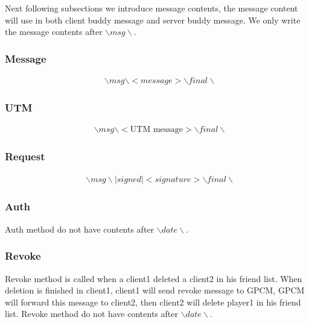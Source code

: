 \documentclass[oneside,titlepage,a4paper]{Definition/retrospy} %
\begin{document}
Next following subsections we introduce message contents,  the message content will use in both client buddy message and server buddy message. We only write the message contents after $ \backslash msg \backslash $.
\subsubsection{Message}
\begin{tcolorbox}
	\begin{equation}
	\begin{split}
& \backslash msg \backslash <message> \backslash final \backslash
	\end{split}
	\end{equation}
\end{tcolorbox}
\subsubsection{UTM}
\begin{tcolorbox}
	\begin{equation}
	\begin{split}
	& \backslash msg \backslash <\text{UTM message}> \backslash final \backslash
	\end{split}
	\end{equation}
\end{tcolorbox}

\subsubsection{Request}
\begin{tcolorbox}
	\begin{equation}
	\begin{split}
	& \backslash msg \backslash |signed|<signature> \backslash final \backslash
	\end{split}
	\end{equation}
\end{tcolorbox}
\subsubsection{Auth}
Auth method do not have contents after $ \backslash date \backslash $.
\subsubsection{Revoke}
Revoke method is called when a client1 deleted a client2 in his friend list. When deletion is finished in client1, client1 will send revoke message to GPCM, GPCM will forward this message to client2, then client2 will delete player1 in his friend list.
Revoke method do not have contents after $ \backslash date \backslash $.
\end{document}
